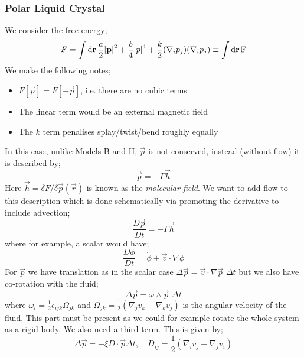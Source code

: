 \subsubsection{Polar Liquid Crystal}
We consider the free energy;
\begin{equation}
F = \int{\upd{\vec{r}}\frac{a}{2}\abs{\vec{p}}^2 + \frac{b}{4}\abs{p}^4 + \frac{k}{2}(\nabla_i p_j)(\nabla_i p_j)} \equiv \int{\upd{\vec{r}}\mathbb{F}}
\end{equation}
We make the following notes;
\begin{itemize}
\item $F[\vec{p}] = F[-\vec{p}]$, i.e. there are no cubic terms
\item The linear term would be an external magnetic field
\item The $k$ term penalises splay/twist/bend roughly equally
\end{itemize}
In this case, unlike Models B and H, $\vec{p}$ is not conserved, instead (without flow) it is described by;
\begin{equation}
\dot{\vec{p}} = -\Gamma \vec{h}
\end{equation}
Here $\vec{h} = \delta F/\delta \vec{p}(\vec{r})$ is known as the \emph{molecular field}. We want to add flow to this description which is done schematically via promoting the derivative to include advection;
\begin{equation*}
\frac{D\vec{p}}{Dt} = -\Gamma \vec{h}
\end{equation*}
where for example, a scalar would have;
\begin{equation*}
\frac{D\phi}{Dt} = \dot{\phi} + \vec{v}\cdot \nabla \phi
\end{equation*}
For $\vec{p}$ we have translation as in the scalar case $\Delta \vec{p} = \vec{v}\cdot \nabla \vec{p}\,\, \Delta t$ but we also have co-rotation with the fluid;
\begin{equation*}
\Delta \vec{p} = \omega \wedge \vec{p} \,\, \Delta t
\end{equation*}
where $\omega_i = \tfrac{1}{2}\epsilon_{ijk}\Omega_{jk}$ and $\Omega_{jk} = \tfrac{1}{2}(\nabla_j v_k - \nabla_k v_j)$ is the angular velocity of the fluid. This part must be present as we could for example rotate the whole system as a rigid body. We also need a third term. This is given by;
\begin{equation*}
\Delta \vec{p} = -\xi D \cdot \vec{p} \Delta t, \quad D_{ij} = \frac{1}{2}\left(\nabla_i v_j + \nabla_j v_i\right)
\end{equation*}

